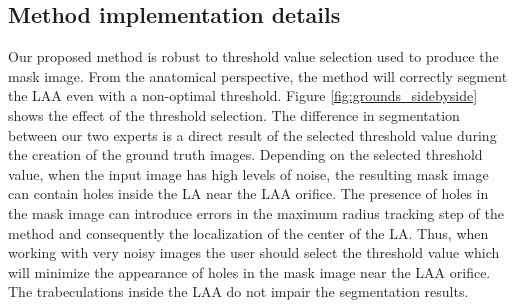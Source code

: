 \documentclass[review]{elsarticle}
\begin{document}
\subsection{Method implementation details}

Our proposed method is robust to threshold value selection used to produce the
mask image. From the anatomical perspective, the method will correctly segment
the LAA even with a non-optimal threshold. 
Figure \ref{fig:grounds_sidebyside} shows the effect of the threshold
selection. The difference in segmentation between our two experts is a direct
result of the selected threshold value during the creation of the ground truth
images. 
  Depending on the selected threshold value, when the input image has high
  levels of noise, the resulting mask image can contain holes inside the LA
  near the LAA orifice. The presence of holes in the mask image can introduce
  errors in the maximum radius tracking step of the method and consequently the
  localization of the center of the LA. Thus, when working with very noisy
  images the user should select the threshold value which will minimize the
  appearance of holes in the mask image near the LAA orifice. The trabeculations
  inside the LAA do not impair the segmentation results.
\end{document}
